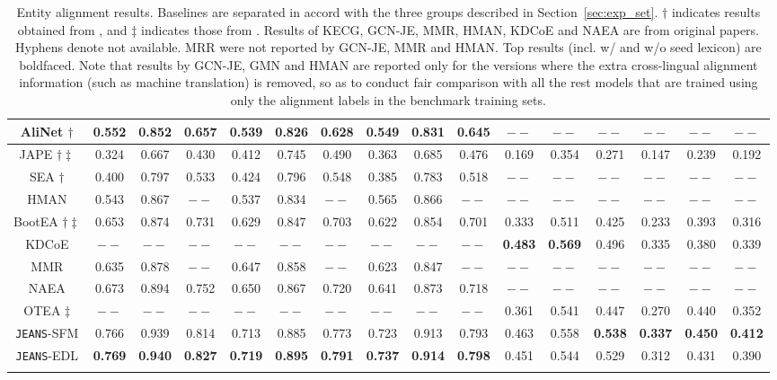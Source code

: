 \documentclass[11pt,a4paper]{article}
\newcommand{\modelname}[0]{\texttt{JEANS}\xspace}
\def\bhline{\specialrule{.2em}{0em}{0em}}
\begin{document}
{\begin{table*}[t]
\begin{tabular}{c|ccc|ccc|ccc|ccc|ccc}
AliNet \cite{sun2020alinet}$\dagger$&0.552&0.852&0.657&0.539&0.826&0.628&0.549&0.831&0.645&$--$&$--$&$--$&$--$&$--$&$--$\\
\hline
JAPE \cite{sun2017cross}$\dagger\ddagger$&0.324&0.667&0.430&0.412&0.745&0.490&0.363&0.685&0.476&0.169&0.354&0.271&0.147&0.239&0.192\\
SEA \cite{pei2019deg}$\dagger$&0.400&0.797&0.533&0.424&0.796&0.548&0.385&0.783&0.518&$--$&$--$&$--$&$--$&$--$&$--$\\
HMAN \cite{yang2019aligning}&0.543&0.867&$--$&0.537&0.834&$--$&0.565&0.866&$--$&$--$&$--$&$--$&$--$&$--$&$--$\\
\hline
BootEA \cite{sun2018bootstrapping}$\dagger\ddagger$&0.653&0.874&0.731&0.629&0.847&0.703&0.622&0.854&0.701&0.333&0.511&0.425&0.233&0.393&0.316\\
KDCoE \cite{chen2018co}&$--$&$--$&$--$&$--$&$--$&$--$&$--$&$--$&$--$&\textbf{0.483}&\textbf{0.569}&0.496&0.335&0.380&0.339\\
MMR \cite{shi2019modeling}&0.635&0.878&$--$&0.647&0.858&$--$&0.623&0.847&$--$&$--$&$--$&$--$&$--$&$--$&$--$\\
NAEA \cite{zhu2019neighborhood}&0.673&0.894&0.752&0.650&0.867&0.720&0.641&0.873&0.718&$--$&$--$&$--$&$--$&$--$&$--$\\
OTEA \cite{pei2019transport}$\ddagger$&$--$&$--$&$--$&$--$&$--$&$--$&$--$&$--$&$--$&0.361&0.541&0.447&0.270&0.440&0.352\\
\hline
\modelname-SFM&0.766&0.939&0.814&0.713&0.885&0.773&0.723&0.913&0.793&0.463&0.558&\textbf{0.538}&\textbf{0.337}&\textbf{0.450}&\textbf{0.412}\\
\modelname-EDL&\textbf{0.769}&\textbf{0.940}&\textbf{0.827}&\textbf{0.719}&\textbf{0.895}&\textbf{0.791}&\textbf{0.737}&\textbf{0.914}&\textbf{0.798}&0.451&0.544&0.529&0.312&0.431&0.390\\
\bhline
\end{tabular}
\caption{Entity alignment results. Baselines are separated in accord with the three groups described in Section~\ref{sec:exp_set}. $\dagger$ indicates results obtained from \cite{sun2020alinet}, and $\ddagger$ indicates those from \cite{pei2019transport}. Results of KECG, GCN-JE, MMR, HMAN, KDCoE and NAEA are from original papers. Hyphens denote not available.
MRR were not reported by GCN-JE, MMR and HMAN. Top results (incl. w/ and w/o seed lexicon) are boldfaced.
Note that results by GCN-JE, GMN and HMAN are reported only for the versions where the extra cross-lingual alignment information (such as machine translation) is removed, so as to conduct fair comparison with all the rest models that are trained using only the alignment labels in the benchmark training sets.
}\label{tbl:entity}
\end{table*}
}
 
\end{document}
